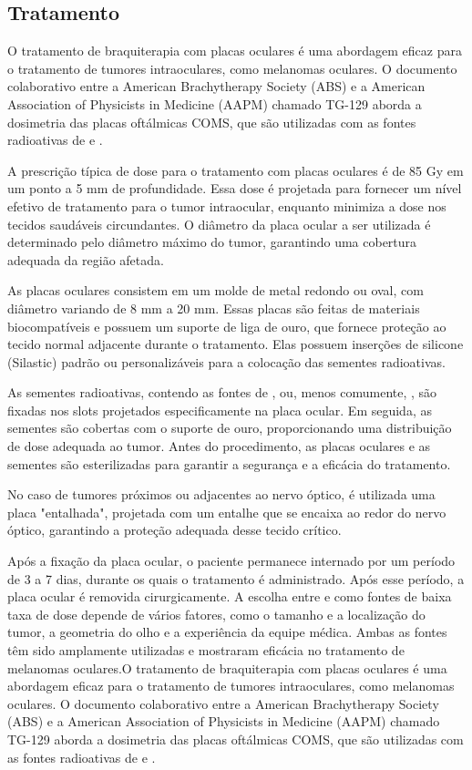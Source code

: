 \documentclass[11pt,a4paper]{article}
\begin{document}
\subsection*{Tratamento}

    O tratamento de braquiterapia com placas oculares é uma abordagem eficaz para o tratamento de tumores intraoculares, como melanomas oculares. O documento colaborativo entre a American Brachytherapy Society (ABS) e a American Association of Physicists in Medicine (AAPM) chamado TG-129 aborda a dosimetria das placas oftálmicas COMS, que são utilizadas com as fontes radioativas de  e .

    A prescrição típica de dose para o tratamento com placas oculares é de 85 Gy em um ponto a 5 mm de profundidade. Essa dose é projetada para fornecer um nível efetivo de tratamento para o tumor intraocular, enquanto minimiza a dose nos tecidos saudáveis circundantes. O diâmetro da placa ocular a ser utilizada é determinado pelo diâmetro máximo do tumor, garantindo uma cobertura adequada da região afetada.

    As placas oculares consistem em um molde de metal redondo ou oval, com diâmetro variando de 8 mm a 20 mm. Essas placas são feitas de materiais biocompatíveis e possuem um suporte de liga de ouro, que fornece proteção ao tecido normal adjacente durante o tratamento. Elas possuem inserções de silicone (Silastic) padrão ou personalizáveis para a colocação das sementes radioativas.

    As sementes radioativas, contendo as fontes de ,  ou, menos comumente, , são fixadas nos slots projetados especificamente na placa ocular. Em seguida, as sementes são cobertas com o suporte de ouro, proporcionando uma distribuição de dose adequada ao tumor. Antes do procedimento, as placas oculares e as sementes são esterilizadas para garantir a segurança e a eficácia do tratamento.

    No caso de tumores próximos ou adjacentes ao nervo óptico, é utilizada uma placa "entalhada", projetada com um entalhe que se encaixa ao redor do nervo óptico, garantindo a proteção adequada desse tecido crítico.

    Após a fixação da placa ocular, o paciente permanece internado por um período de 3 a 7 dias, durante os quais o tratamento é administrado. Após esse período, a placa ocular é removida cirurgicamente. A escolha entre  e  como fontes de baixa taxa de dose depende de vários fatores, como o tamanho e a localização do tumor, a geometria do olho e a experiência da equipe médica. Ambas as fontes têm sido amplamente utilizadas e mostraram eficácia no tratamento de melanomas oculares.O tratamento de braquiterapia com placas oculares é uma abordagem eficaz para o tratamento de tumores intraoculares, como melanomas oculares. O documento colaborativo entre a American Brachytherapy Society (ABS) e a American Association of Physicists in Medicine (AAPM) chamado TG-129 aborda a dosimetria das placas oftálmicas COMS, que são utilizadas com as fontes radioativas de  e .
\end{document}
